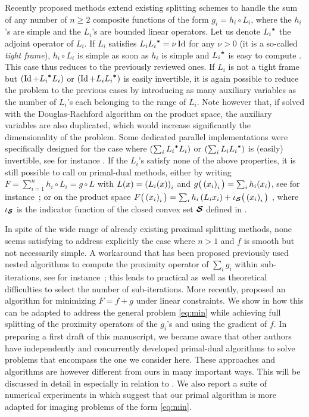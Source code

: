 Recently proposed methods extend existing splitting schemes to handle the sum of any number of $n \geq 2$ composite functions of the form $g_i = h_i \circ L_i$, where the $h_i$'s are simple and the $L_i$'s are bounded linear operators. Let us denote ${L_i}^{\boldsymbol*}$ the adjoint operator of $L_i$. If $L_i$ satisfies $L_i  {L_i}^{\boldsymbol*} = \nu \operatorname{Id}$ for any $\nu > 0$ (it is a so-called \textit{tight frame}), $h_i \circ L_i$ is simple as soon as $h_i$ is simple and ${L_i}^{\boldsymbol*}$ is easy to compute \cite{Combettes07a}. This case thus reduces to the previously reviewed ones. If $L_i$ is not a tight frame but $\left( \operatorname{Id} + {L_i}^{\boldsymbol*} L_i \right)$ or $\left( \operatorname{Id} + L_i {L_i}^{\boldsymbol*} \right)$ is easily invertible, it is again possible to reduce the problem to the previous cases by introducing as many auxiliary variables as the number of $L_i$'s each belonging to the range of $L_i$. Note however that, if solved with the Douglas-Rachford algorithm on the product space, the auxiliary variables are also duplicated, which would increase significantly the dimensionality of the problem. Some dedicated parallel implementations were specifically designed for the case where $\left( \sum_i {L_i}^{\boldsymbol*} L_i \right)$ or $\left( \sum_i L_i {L_i}^{\boldsymbol*} \right)$ is (easily) invertible, see for instance \cite{Eckstein94,PesquetPustelnik11}. If the $L_i$'s satisfy none of the above properties, it is still possible to call on primal-dual methods, either by writing $F = \sum_{i=1}^n h_i \circ L_i = g \circ L$ with $L(x) = \left( L_i(x) \right)_i$ and $g \big( \left( x_i \right)_i \big) = \sum_i h_i(x_i)$, see for instance~\cite{Dupe11b}; or on the product space $F \big( \left( x_i \right)_i \big) = \sum_i h_i \left(  L_i x_i  \right) + \iota_{\boldsymbol {\mathcal{S}}} \big( \left( x_i \right)_i \big)$ \cite{Briceno-AriasCombettes11}, where $\iota_{\boldsymbol {\mathcal{S}}}$ is the indicator function of the closed convex set $\boldsymbol {\mathcal{S}}$ defined in .

In spite of the wide range of already existing proximal splitting methods, none seems satisfying to address explicitly the case where $n > 1$ and $f$ is smooth but not necessarily simple. A workaround that has been proposed previously used nested algorithms to compute the proximity operator of $\sum_i g_i$ within sub-iterations, see for instance~\cite{Chaux09,Dupe09}; this leads to practical as well as theoretical difficulties to select the number of sub-iterations. More recently, \cite{MonteiroSvaiter10} proposed an algorithm for minimizing $F = f + g$ under linear constraints. We show in  how this can be adapted to address the general problem \eqref{eq:min} while achieving full splitting of the proximity operators of the $g_i$'s and using the gradient of $f$. In preparing a first draft of this manuscript, we became aware that other authors \cite{CombettesPesquet11,Condat11,Vu11} have independently and concurrently developed primal-dual algorithms to solve problems that encompass the one we consider here. These approaches and algorithms are however different from ours in many important ways. This will be discussed in detail in  especially in relation to \cite{CombettesPesquet11}. We also report a suite of numerical experiments in  which suggest that our primal algorithm is more adapted for imaging problems of the form \eqref{eq:min}.

